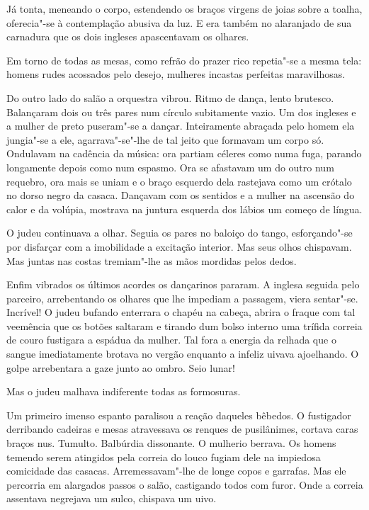 Já tonta, meneando o corpo, estendendo os braços virgens de joias sobre
a toalha, oferecia"-se à contemplação abusiva da luz. E era também no
alaranjado de sua carnadura que os dois ingleses apascentavam os
olhares.

Em torno de todas as mesas, como refrão do prazer rico repetia"-se a
mesma tela: homens rudes acossados pelo desejo, mulheres incastas
perfeitas maravilhosas.

Do outro lado do salão a orquestra vibrou. Ritmo de dança, lento
brutesco. Balançaram dois ou três pares num círculo subitamente vazio.
Um dos ingleses e a mulher de preto puseram"-se a dançar. Inteiramente
abraçada pelo homem ela jungia"-se a ele, agarrava"-se"-lhe de tal jeito
que formavam um corpo só. Ondulavam na cadência da música: ora partiam
céleres como numa fuga, parando longamente depois como num espasmo. Ora
se afastavam um do outro num requebro, ora mais se uniam e o braço
esquerdo dela rastejava como um crótalo no dorso negro da casaca.
Dançavam com os sentidos e a mulher na ascensão do calor e da volúpia,
mostrava na juntura esquerda dos lábios um começo de língua.

O judeu continuava a olhar. Seguia os pares no baloiço do tango,
esforçando"-se por disfarçar com a imobilidade a excitação interior. Mas
seus olhos chispavam. Mas juntas nas costas tremiam"-lhe as mãos mordidas
pelos dedos.

Enfim vibrados os últimos acordes os dançarinos pararam. A inglesa
seguida pelo parceiro, arrebentando os olhares que lhe impediam a
passagem, viera sentar"-se. Incrível! O judeu bufando enterrara o chapéu
na cabeça, abrira o fraque com tal veemência que os botões saltaram e
tirando dum bolso interno uma trífida correia de couro fustigara a
espádua da mulher. Tal fora a energia da relhada que o sangue
imediatamente brotava no vergão enquanto a infeliz uivava ajoelhando. O
golpe arrebentara a gaze junto ao ombro. Seio lunar!

Mas o judeu malhava indiferente todas as formosuras.

Um primeiro imenso espanto paralisou a reação daqueles bêbedos. O
fustigador derribando cadeiras e mesas atravessava os renques de
pusilânimes, cortava caras braços nus. Tumulto. Balbúrdia dissonante. O
mulherio berrava. Os homens temendo serem atingidos pela correia do
louco fugiam dele na impiedosa comicidade das casacas. Arremessavam"-lhe
de longe copos e garrafas. Mas ele percorria em alargados passos o
salão, castigando todos com furor. Onde a correia assentava negrejava um
sulco, chispava um uivo.

